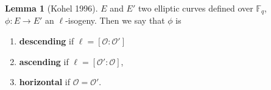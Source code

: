 \documentclass[10pt,a4paper]{beamer}
\theoremstyle{plain}
\theoremstyle{definition}
\newtheorem{lem}[thm]{Lemma}
\theoremstyle{definition}
\theoremstyle{definition}
\theoremstyle{definition}
\newtheorem{defi}[thm]{Definition}
\theoremstyle{remark}
\theoremstyle{remark}
\begin{document}
\begin{frame}
\begin{columns}
\begin{column}{6cm}
{\begin{figure}
\begin{center}
\begin{tikzpicture}[scale=0.60]


\end{tikzpicture}
\end{center}		
\end{figure}}


\end{column}
\begin{column}{4cm}
\begin{lem}[Kohel 1996]
$E$ and $E'$ two elliptic curves defined over $\mathbb{F}_q$, $\phi :E \rightarrow E'$ an $\ell$-isogeny. Then we say that $\phi$ is
\begin{enumerate}
\item  \textbf<1>{descending} if $\ell=[\mathcal{O} : \mathcal{O}']$
\pause
\item \textbf<2>{ascending} if $\ell=[\mathcal{O}':\mathcal{O}]$,
\pause 
\item \textbf<3>{horizontal} if $\mathcal{O}=\mathcal{O}'$.
\end{enumerate}
\end{lem}
\end{column}

\end{columns}
\end{frame}
\end{document}
